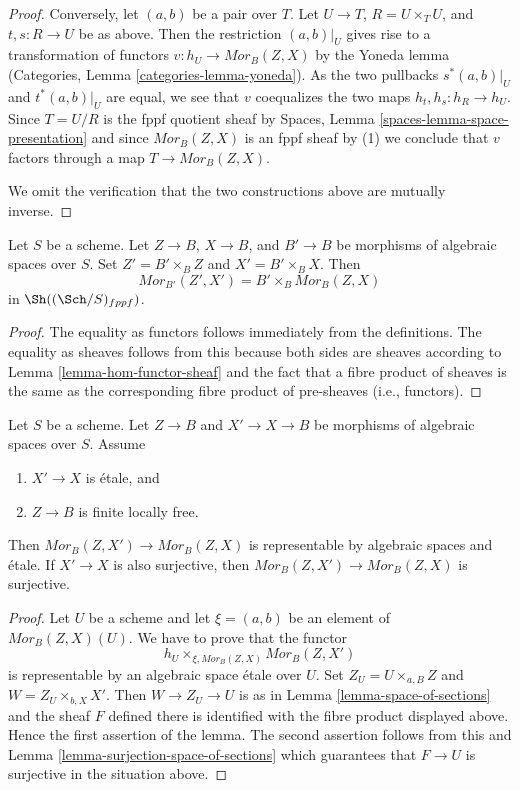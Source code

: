 \begin{proof}
\medskip\noindent
Conversely, let $(a, b)$ be a pair over $T$.
Let $U \to T$, $R = U \times_T U$, and $t, s : R \to U$ be as
above. Then the restriction $(a, b)|_U$ gives rise to a
transformation of functors $v : h_U \to \mathit{Mor}_B(Z, X)$ by the
Yoneda lemma
(Categories, Lemma \ref{categories-lemma-yoneda}).
As the two pullbacks $s^*(a, b)|_U$ and $t^*(a, b)|_U$
are equal, we see that $v$ coequalizes the two maps
$h_t, h_s : h_R \to h_U$. Since $T = U/R$ is the fppf quotient sheaf by
Spaces, Lemma \ref{spaces-lemma-space-presentation}
and since $\mathit{Mor}_B(Z, X)$ is an fppf sheaf by (1) we conclude
that $v$ factors through a map $T \to \mathit{Mor}_B(Z, X)$.

\medskip\noindent
We omit the verification that the two constructions above are mutually
inverse.
\end{proof}

\begin{lemma}
\label{lemma-base-change-hom-functor}
Let $S$ be a scheme. Let $Z \to B$, $X \to B$, and $B' \to B$
be morphisms of algebraic spaces over $S$. Set $Z' = B' \times_B Z$
and $X' = B' \times_B X$. Then
$$
\mathit{Mor}_{B'}(Z', X')
=
B' \times_B \mathit{Mor}_B(Z, X)
$$
in $\Sh((\Sch/S)_{fppf})$.
\end{lemma}

\begin{proof}
The equality as functors follows immediately from the definitions.
The equality as sheaves follows from this because both sides are
sheaves according to
Lemma \ref{lemma-hom-functor-sheaf}
and the fact that a fibre product of sheaves is the same as the
corresponding fibre product of pre-sheaves (i.e., functors).
\end{proof}

\begin{lemma}
\label{lemma-etale-covering-hom-functor}
Let $S$ be a scheme. Let $Z \to B$ and $X' \to X \to B$ be morphisms of
algebraic spaces over $S$. Assume
\begin{enumerate}
\item $X' \to X$ is \'etale, and
\item $Z \to B$ is finite locally free.
\end{enumerate}
Then $\mathit{Mor}_B(Z, X') \to \mathit{Mor}_B(Z, X)$ is representable
by algebraic spaces and \'etale. If $X' \to X$ is also surjective,
then $\mathit{Mor}_B(Z, X') \to \mathit{Mor}_B(Z, X)$ is surjective.
\end{lemma}

\begin{proof}
Let $U$ be a scheme and let $\xi = (a, b)$ be an element of
$\mathit{Mor}_B(Z, X)(U)$. We have to prove that the functor
$$
h_U \times_{\xi, \mathit{Mor}_B(Z, X)} \mathit{Mor}_B(Z, X')
$$
is representable by an algebraic space \'etale over $U$. Set
$Z_U = U \times_{a, B} Z$ and $W = Z_U \times_{b, X} X'$.
Then $W \to Z_U \to U$ is as in
Lemma \ref{lemma-space-of-sections}
and the sheaf $F$ defined there is identified with the fibre product
displayed above. Hence the first assertion of the lemma.
The second assertion follows from this and
Lemma \ref{lemma-surjection-space-of-sections}
which guarantees that $F \to U$ is surjective in the situation above.
\end{proof}


